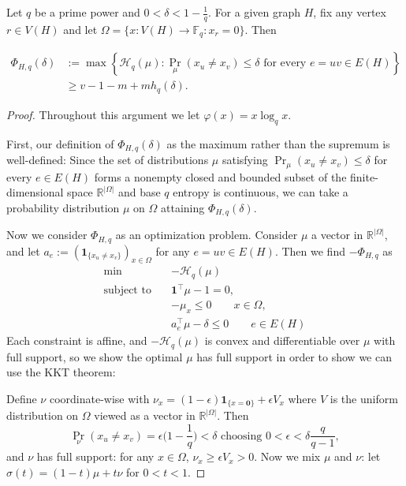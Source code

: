 \documentclass[10pt,a4paper]{amsart}
\newcommand{\Fq}{\mathbb{F}_q}
\begin{document}
\begin{lemma}
\label{lem: entropy-inequality}
Let $q$ be a prime power and $0<\delta<1-\frac1q$. For a given graph $H$, fix any vertex $r\in V(H)$ and let $\Omega=\{x:V(H)\to\Fq:x_r=0\}$. Then

\begin{align*}
    \Phi_{H,q}(\delta)&:= \max\left\{\mathcal H_q(\mu):\Pr_\mu(x_u\not=x_v)\leq\delta\text{ for every }e=uv\in E(H)\right\}\\
    &\ge v-1-m+mh_q(\delta).
\end{align*}

\end{lemma}

\begin{proof}
Throughout this argument we let $\varphi(x)=x\log_qx$.

First, our definition of $\Phi_{H,q}(\delta)$ as the maximum rather than the supremum is well-defined: Since the set of distributions $\mu$ satisfying $\Pr_\mu(x_u\not=x_v)\leq\delta$ for every $e\in E(H)$ forms a nonempty closed and bounded subset of the finite-dimensional space $\mathbb R^{|\Omega|}$ and base $q$ entropy is continuous, we can take a probability distribution $\mu$ on $\Omega$ attaining $\Phi_{H,q}(\delta)$.

Now we consider $\Phi_{H,q}$ as an optimization problem. Consider $\mu$ a vector in $\mathbb R^{|\Omega|}$, and let $a_{e}:=(\mathbf1_{\{x_u\not=x_v\}})_{x\in\Omega}$ for any $e=uv\in E(H)$. Then we find $-\Phi_{H,q}$ as
\[
\begin{aligned}
\min\quad & -\mathcal{H}_q(\mu)\\
\text{subject to}\quad
&\mathbf1^\top\mu-1=0,\\
&-\mu_x\leq0\qquad x\in\Omega,\\
&a_{e}^\top\mu-\delta\leq0\qquad e\in E(H)
\end{aligned}
\]
Each constraint is affine, and $-\mathcal{H}_q(\mu)$ is convex and differentiable over $\mu$ with full support, so we  show the optimal $\mu$ has full support in order to show we can use the KKT theorem:

Define $\nu$ coordinate-wise with $\nu_x=(1-\epsilon)\mathbf1_{\{x=\mathbf0\}}+\epsilon V_x$ where $V$ is the uniform distribution on $\Omega$ viewed as a vector in $\mathbb R^{|\Omega|}$. Then
\[
\Pr_{\nu}(x_u\not=x_v)=\epsilon\bigl(1-\frac 1q\bigr)<\delta\text{ choosing }0<\epsilon<\delta\frac{q}{q-1},
\]
and $\nu$ has full support: for any $x\in\Omega$, $\nu_x\geq\epsilon V_x>0$. Now we mix $\mu$ and $\nu$: let $\sigma(t)=(1-t)\mu+t\nu$ for $0<t<1$.


\end{proof}
\end{document}
